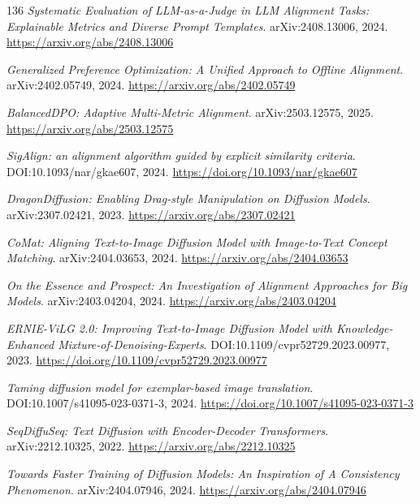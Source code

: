 \documentclass[11pt,a4paper]{article}
\begin{document}
\begin{thebibliography}{136}
\newblock \emph{Systematic Evaluation of LLM-as-a-Judge in LLM Alignment Tasks: Explainable Metrics and Diverse Prompt Templates}.
\newblock arXiv:2408.13006, 2024.
\newblock \url{https://arxiv.org/abs/2408.13006}

\newblock \emph{Generalized Preference Optimization: A Unified Approach to Offline Alignment}.
\newblock arXiv:2402.05749, 2024.
\newblock \url{https://arxiv.org/abs/2402.05749}

\newblock \emph{BalancedDPO: Adaptive Multi-Metric Alignment}.
\newblock arXiv:2503.12575, 2025.
\newblock \url{https://arxiv.org/abs/2503.12575}

\newblock \emph{SigAlign: an alignment algorithm guided by explicit similarity criteria}.
\newblock DOI:10.1093/nar/gkae607, 2024.
\newblock \url{https://doi.org/10.1093/nar/gkae607}

\newblock \emph{DragonDiffusion: Enabling Drag-style Manipulation on Diffusion Models}.
\newblock arXiv:2307.02421, 2023.
\newblock \url{https://arxiv.org/abs/2307.02421}

\newblock \emph{CoMat: Aligning Text-to-Image Diffusion Model with Image-to-Text Concept Matching}.
\newblock arXiv:2404.03653, 2024.
\newblock \url{https://arxiv.org/abs/2404.03653}

\newblock \emph{On the Essence and Prospect: An Investigation of Alignment Approaches for Big Models}.
\newblock arXiv:2403.04204, 2024.
\newblock \url{https://arxiv.org/abs/2403.04204}

\newblock \emph{ERNIE-ViLG 2.0: Improving Text-to-Image Diffusion Model with Knowledge-Enhanced Mixture-of-Denoising-Experts}.
\newblock DOI:10.1109/cvpr52729.2023.00977, 2023.
\newblock \url{https://doi.org/10.1109/cvpr52729.2023.00977}

\newblock \emph{Taming diffusion model for exemplar-based image translation}.
\newblock DOI:10.1007/s41095-023-0371-3, 2024.
\newblock \url{https://doi.org/10.1007/s41095-023-0371-3}

\newblock \emph{SeqDiffuSeq: Text Diffusion with Encoder-Decoder Transformers}.
\newblock arXiv:2212.10325, 2022.
\newblock \url{https://arxiv.org/abs/2212.10325}

\newblock \emph{Towards Faster Training of Diffusion Models: An Inspiration of A Consistency Phenomenon}.
\newblock arXiv:2404.07946, 2024.
\newblock \url{https://arxiv.org/abs/2404.07946}


\end{thebibliography}
\end{document}
